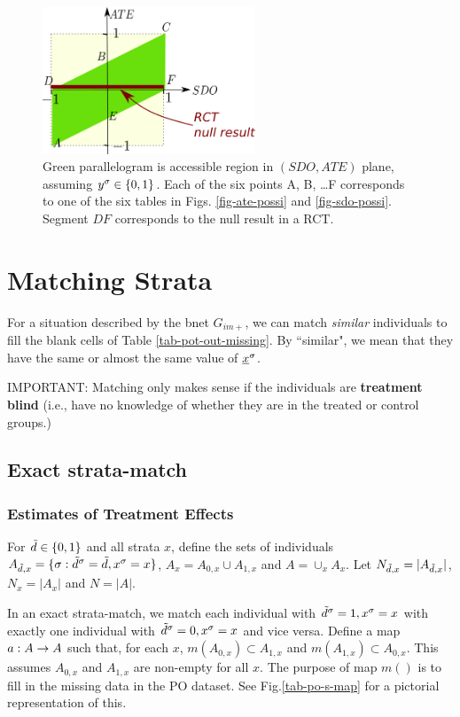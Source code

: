 \begin{figure}[h!]
\centering
\includegraphics[width=2.5in]
{pot-out/sdo-ate-polytope.png}
\caption{
Green parallelogram
is accessible region in
$(SDO,ATE)$ plane,
assuming $y^\sigma\in \{0,1\}$.
Each of the
six points A, B, \ldots F
corresponds to one of the six tables
in Figs. \ref{fig-ate-possi}
and \ref{fig-sdo-possi}.
Segment $DF$ 
corresponds to the null
result in a RCT. 
} 
\label{fig-sdo-ate-polytope}
\end{figure}



\section{Matching Strata}

For a situation
described by
the bnet $G_{im+}$,
we can match {\it similar}
individuals to fill the blank cells of
 Table \ref{tab-pot-out-missing}.
By ``similar", we mean that
they have the same or almost the same
value of ${\underline{x}}^\sigma$.

IMPORTANT: Matching 
only makes sense 
if the individuals 
are {\bf treatment blind} (i.e., 
have no knowledge
of whether they are
in the treated or control
groups.)


\subsection{Exact strata-match}

\subsubsection{Estimates of Treatment Effects}
\label{sec-estimates}
For ${\tilde{d}}\in \{0,1\}$ and all strata $x$,
define the sets of individuals
$A_{{\tilde{d}},x}=\{\sigma: {\tilde{d}}^\sigma={\tilde{d}}, x^\sigma=x\}$,
$A_x=A_{0,x}\cup A_{1,x}$ and $A=\cup_x A_x$.
Let $N_{{\tilde{d}},x}=|A_{{\tilde{d}},x}|$,
$N_x= |A_x|$ and $N=|A|$.

In an exact strata-match,
we match each individual with
${\tilde{d}}^\sigma=1, x^\sigma=x$
with
exactly
one individual
with ${\tilde{d}}^\sigma=0, x^\sigma=x$
and vice versa.
Define a map $a:A\rightarrow A$
such that,
for each $x$,
$m(A_{0,x})\subset A_{1,x}$ and
$m(A_{1,x})\subset A_{0,x}$.
This assumes $A_{0,x}$ and $A_{1,x}$
are non-empty for all $x$.
The purpose of map $m()$
is
to fill in the missing data in the
PO dataset. See Fig.\ref{tab-po-s-map}
for a pictorial representation of 
this.

